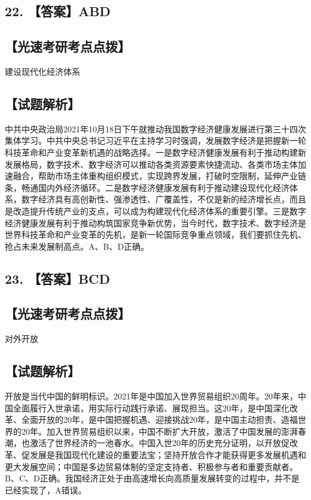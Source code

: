 \documentclass[UTF8,11pt]{ctexart}
\begin{document}
\subsection*{22. 【答案】ABD}

\subsection*{【光速考研考点点拨】}

建设现代化经济体系


\subsection*{【试题解析】}

中共中央政治局2021年10月18日下午就推动我国数字经济健康发展进行第三十四次集体学习。中共中央总书记习近平在主持学习时强调，发展数字经济是把握新一轮科技革命和产业变革新机遇的战略选择。一是数字经济健康发展有利于推动构建新发展格局，数字技术、数字经济可以推动各类资源要素快捷流动、各类市场主体加速融合，帮助市场主体重构组织模式，实现跨界发展，打破时空限制，延伸产业链条，畅通国内外经济循环。二是数字经济健康发展有利于推动建设现代化经济体系，数字经济具有高创新性、强渗透性、广覆盖性，不仅是新的经济增长点，而且是改造提升传统产业的支点，可以成为构建现代化经济体系的重要引擎。三是数字经济健康发展有利于推动构筑国家竞争新优势，当今时代，数字技术、数字经济是世界科技革命和产业变革的先机，是新一轮国际竞争重点领域，我们要抓住先机、抢占未来发展制高点。A、B、D正确。


\subsection*{23. 【答案】BCD}

\subsection*{【光速考研考点点拨】}

对外开放


\subsection*{【试题解析】}

开放是当代中国的鲜明标识。2021年是中国加入世界贸易组织20周年。20年来，中国全面履行入世承诺，用实际行动践行承诺、展现担当。这20年，是中国深化改革、全面开放的20年，是中国把握机遇、迎接挑战20年，是中国主动担责、造福世界的20年。加入世界贸易组织以来，中国不断扩大开放，激活了中国发展的澎湃春潮，也激活了世界经济的一池春水。中国入世20年的历史充分证明，以开放促改革、促发展是我国现代化建设的重要法宝；坚持开放合作才能获得更多发展机遇和更大发展空间；中国是多边贸易体制的坚定支持者、积极参与者和重要贡献者。B、C、D正确。我国经济正处于由高速增长向高质量发展转变的过程中，并不是已经实现了，A错误。
\end{document}

